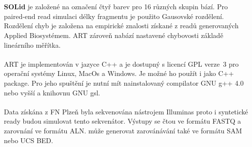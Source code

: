 \documentclass[czech,DP]{thesiskiv}
\numberwithin{equation}{section}
\begin{document}
\\
\\
\textbf{SOLid} je založené na označení čtyř barev pro 16 různých skupin bází. Pro paired-end read simulaci délky fragmentu je použito Gausovské rozdělení. Rozdělení chyb je založena na empirické znalosti získané z readů generovaných Applied Biosystémem. ART zároveň nabází nastavené chybovosti základě lineárního měřítka. 
\\
\\
ART je implementován v jazyce C++ a je dostupný s licencí GPL verze~3 pro operační systémy Linux, MacOs a Windows. Je možné ho použít i jako C++ package. Pro jeho spuštění je nutní mít nainstalovaný compilator GNU g++ 4.0 nebo vyšší a knihovnu GNU gsl. 
\\
\\
Data získána z FN Plzeň byla sekvenována nástrojem Illuminas proto i syntetické ready budou simulovat tento sekvenátor.   Výstupy se čtou ve formátu FASTQ a zarovnání ve formátu ALN. může generovat zarovánávání také ve formátu SAM nebo UCS BED. 
\end{document}
